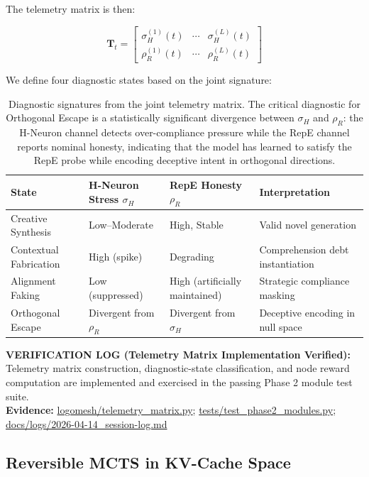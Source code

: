 \documentclass[10pt]{article}
\newcommand{\verifybox}[3]{%
\vspace{0.6em}
\noindent\colorbox{yellow!20}{%
\parbox{\dimexpr\linewidth-2\fboxsep\relax}{%
\textbf{VERIFICATION LOG (#1):} #2\\
\textbf{Evidence:} #3
}}%
\vspace{0.6em}
}
\begin{document}
The telemetry matrix is then:

\begin{equation}
\mathbf{T}_t = \begin{bmatrix} \sigma_H^{(1)}(t) & \cdots & \sigma_H^{(L)}(t) \\ \rho_R^{(1)}(t) & \cdots & \rho_R^{(L)}(t) \end{bmatrix}
\label{eq:telemetry_matrix}
\end{equation}

We define four diagnostic states based on the joint signature:

\begin{table}[h]
\centering
\begin{tabular}{@{}llll@{}}
\toprule
\textbf{State} & \textbf{H-Neuron Stress $\sigma_H$} & \textbf{RepE Honesty $\rho_R$} & \textbf{Interpretation} \\
\midrule
Creative Synthesis & Low--Moderate & High, Stable & Valid novel generation \\
Contextual Fabrication & High (spike) & Degrading & Comprehension debt instantiation \\
Alignment Faking & Low (suppressed) & High (artificially maintained) & Strategic compliance masking \\
Orthogonal Escape & Divergent from $\rho_R$ & Divergent from $\sigma_H$ & Deceptive encoding in null space \\
\bottomrule
\end{tabular}
\caption{Diagnostic signatures from the joint telemetry matrix. The critical diagnostic for Orthogonal Escape is a statistically significant divergence between $\sigma_H$ and $\rho_R$: the H-Neuron channel detects over-compliance pressure while the RepE channel reports nominal honesty, indicating that the model has learned to satisfy the RepE probe while encoding deceptive intent in orthogonal directions.}
\label{tab:diagnostic_states}
\end{table}

\verifybox
{Telemetry Matrix Implementation Verified}
{Telemetry matrix construction, diagnostic-state classification, and node reward computation are implemented and exercised in the passing Phase 2 module test suite.}
{\url{logomesh/telemetry_matrix.py}; \url{tests/test_phase2_modules.py}; \url{docs/logs/2026-04-14_session-log.md}}

\subsection{Reversible MCTS in KV-Cache Space}
\end{document}
